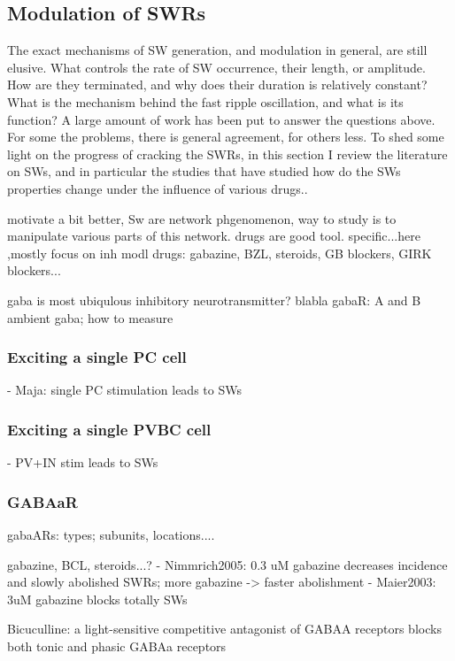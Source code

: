   \subsection{Modulation of SWRs}
    The exact mechanisms of SW generation, and modulation in general, are still
    elusive. What controls the rate of SW occurrence, their length, or
    amplitude. How are they terminated, and why does their duration is
    relatively constant? What is the mechanism behind the fast ripple
    oscillation, and what is its function? A large amount of work has been put
    to answer the questions above. For some the problems, there is general
    agreement, for others less. To shed some light on the progress of cracking
    the SWRs, in this section I review the literature on SWs, and in particular
    the studies that have studied how do the SWs properties change under the
    influence of various drugs..

    motivate a bit better, Sw are network phgenomenon, way to study is to manipulate various parts of this network. drugs are good tool. specific...here ,mostly focus on inh modl drugs: gabazine, BZL, steroids, GB blockers, GIRK blockers...

    gaba is most ubiqulous inhibitory neurotransmitter? blabla
    gabaR: A and B
    ambient gaba; how to measure

    \subsubsection{Exciting a single PC cell}

      - Maja: single PC stimulation leads to SWs

    \subsubsection{Exciting a single PVBC cell}
      - PV+IN stim leads to SWs


    \subsubsection{GABAaR}
      gabaARs: types; subunits, locations....

      gabazine, BCL, steroids...?
      - Nimmrich2005: 0.3 uM gabazine decreases incidence and slowly abolished SWRs; more gabazine -> faster abolishment
      - Maier2003: 3uM gabazine blocks totally SWs 

      Bicuculline: a light-sensitive competitive antagonist of GABAA receptors blocks both tonic and phasic GABAa receptors



